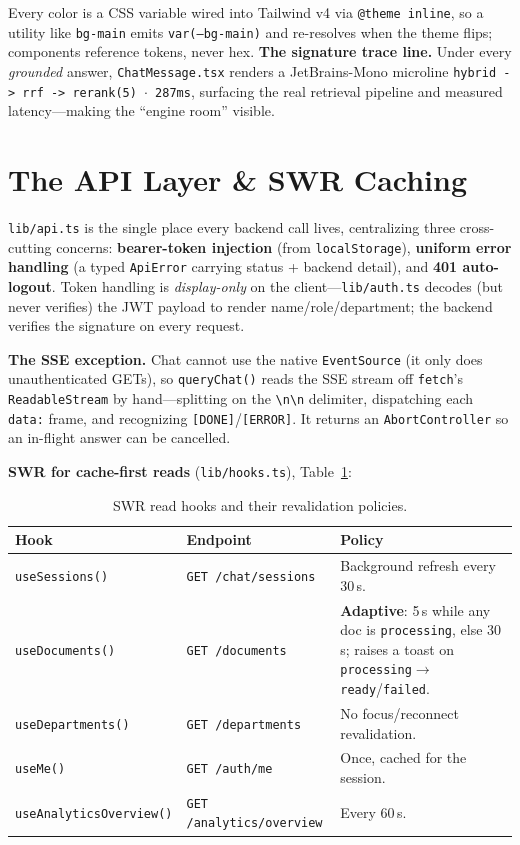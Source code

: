 \documentclass[11pt,a4paper,oneside]{report}
\newcommand{\code}[1]{\texttt{#1}}
\begin{document}
Every color is a CSS variable wired into Tailwind v4 via \code{@theme inline}, so a utility like
\code{bg-main} emits \code{var(--bg-main)} and re-resolves when the theme flips; components reference
tokens, never hex. \textbf{The signature trace line.} Under every \emph{grounded} answer,
\code{ChatMessage.tsx} renders a JetBrains-Mono microline \code{hybrid -> rrf -> rerank(5) $\cdot$
287ms}, surfacing the real retrieval pipeline and measured latency---making the ``engine room''
visible.

\section{The API Layer \& SWR Caching}
\code{lib/api.ts} is the single place every backend call lives, centralizing three cross-cutting
concerns: \textbf{bearer-token injection} (from \code{localStorage}), \textbf{uniform error handling}
(a typed \code{ApiError} carrying status + backend detail), and \textbf{401 auto-logout}. Token
handling is \emph{display-only} on the client---\code{lib/auth.ts} decodes (but never verifies) the
JWT payload to render name/role/department; the backend verifies the signature on every request.

\textbf{The SSE exception.} Chat cannot use the native \code{EventSource} (it only does
unauthenticated GETs), so \code{queryChat()} reads the SSE stream off \code{fetch}'s
\code{ReadableStream} by hand---splitting on the \code{\textbackslash n\textbackslash n} delimiter,
dispatching each \code{data:} frame, and recognizing \code{[DONE]}/\code{[ERROR]}. It returns an
\code{AbortController} so an in-flight answer can be cancelled.

\textbf{SWR for cache-first reads} (\code{lib/hooks.ts}), Table~\ref{tab:swr}:

\begin{table}[htbp]
\centering
\caption{SWR read hooks and their revalidation policies.}
\label{tab:swr}
\begin{tabularx}{\linewidth}{|l|l|X|}
\hline
\rowcolor{ink}
{\color{white}\textbf{Hook}} & {\color{white}\textbf{Endpoint}} & {\color{white}\textbf{Policy}}\\
\hline
\code{useSessions()} & \code{GET /chat/sessions} & Background refresh every 30\,s.\\ \hline
\code{useDocuments()} & \code{GET /documents} & \textbf{Adaptive}: 5\,s while any doc is \code{processing}, else 30\,s; raises a toast on \code{processing}$\to$\code{ready}/\code{failed}.\\ \hline
\code{useDepartments()} & \code{GET /departments} & No focus/reconnect revalidation.\\ \hline
\code{useMe()} & \code{GET /auth/me} & Once, cached for the session.\\ \hline
\code{useAnalyticsOverview()} & \code{GET /analytics/overview} & Every 60\,s.\\ \hline
\end{tabularx}
\end{table}
\end{document}
